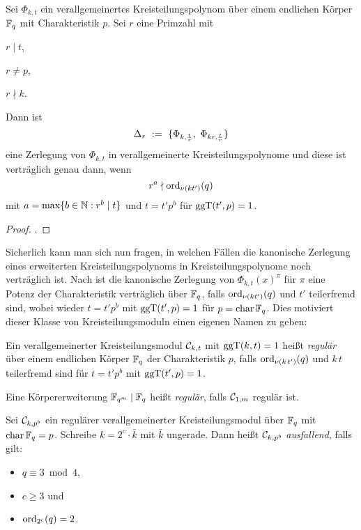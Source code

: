 \begin{satz}
  \label{satz:zerlegungssatz}
  Sei $\Phi_{k,t}$ ein verallgemeinertes Kreisteilungspolynom über einem
  endlichen Körper $\mathbb{F}_q$ mit Charakteristik $p$. Sei $r$ eine Primzahl
  mit

  \begin{itemize*}[itemjoin={\qquad}]
    \item $r \mid t$,
    \item $r \neq p$,
    \item $r \nmid k$.
  \end{itemize*}

  Dann ist 
  \[ \Delta_r \ :=\  \{ \Phi_{k,\frac{t}{r}},\ \Phi_{kr, \frac{t}{r}}\}\]
  eine Zerlegung von $\Phi_{k,t}$ in verallgemeinerte Kreisteilungspolynome und
  diese ist verträglich genau dann, wenn
  \[ r^a \nmid \operatorname{ord}_{\nu(kt')}(q) \]
  mit $a = \max\{ b\in \mathbb{N}: r^b \mid t\}$ und 
  $t=t'p^b$ für $\operatorname{ggT}(t',p)=1$.
\end{satz}
\begin{proof}
  \autocite[Decomposition Theorem, Section 19]{hachenberger1997finite}.
\end{proof}


Sicherlich kann man sich nun fragen, in welchen Fällen die kanonische Zerlegung
eines erweiterten Kreisteilungspolynoms in Kreisteilungspolynome noch
verträglich ist. Nach \autocite[Theorem 19.10]{hachenberger1997finite} 
ist die kanonische Zerlegung von $\Phi_{k,t}(x)^\pi$ für $\pi$ eine Potenz der
Charakteristik verträglich über 
$\mathbb{F}_q$, falls $\operatorname{ord}_{\nu(kt')}(q)$ und $t'$ teilerfremd sind,
wobei wieder $t = t'p^b$ mit $\operatorname{ggT}(t',p)=1$ für $p=\operatorname{char}\mathbb{F}_q$. Dies motiviert
dieser Klasse von Kreisteilungsmoduln einen eigenen Namen zu geben:

\begin{definition}[regulär]
  \label{def:regulaer}
  Ein verallgemeinerter Kreisteilungsmodul $\mathcal{C}_{k,t}$ 
  mit $\operatorname{ggT}(k,t)=1$ heißt \emph{regulär} über 
  einem endlichen Körper $\mathbb{F}_q$ der Charakteristik $p$,
  falls $\operatorname{ord}_{\nu(k\,t')}(q)$ und $k\,t$ teilerfremd sind für
  $t=t'p^b$ mit $\operatorname{ggT}(t',p)=1$.

  Eine Körpererweiterung $\mathbb{F}_{q^m} \mid \mathbb{F}_q$ heißt \emph{regulär}, falls
  $\mathcal{C}_{1,m}$ regulär ist.
\end{definition}


\begin{definition}[ausfallend]
  \label{def:ausfallend}
  Sei $\mathcal{C}_{k, p^b}$ ein regulärer verallgemeinerter Kreisteilungsmodul 
  über $\mathbb{F}_q$ mit $\operatorname{char} \mathbb{F}_q = p$. Schreibe $k = 2^c \cdot \bar k$ mit $\bar
  k$ ungerade. Dann heißt $\mathcal{C}_{k,p^b}$ \emph{ausfallend}, falls gilt:
  \begin{itemize}
    \item $q \equiv 3 \bmod 4$,
    \item $c \geq 3$ und 
    \item $\operatorname{ord}_{2^c}(q) = 2$.
  \end{itemize}
\end{definition}


